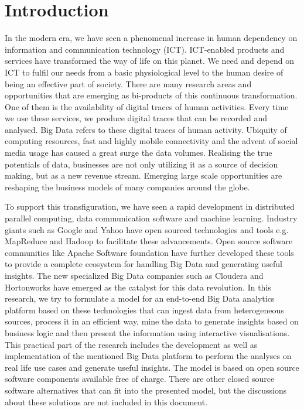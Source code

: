 \setcounter{page}{1}
\chapter{Introduction}
\label{chapter:intro}

 In the modern era, we have seen a phenomenal increase in human dependency on information and communication technology (ICT). ICT-enabled products and services have transformed the way of life on this planet. We need and depend on ICT to fulfil our needs from a basic physiological level to the human desire of being an effective part of society. There are many research areas and opportunities that are emerging as bi-products of this continuous transformation. One of them is the availability of digital traces of human activities. Every time we use these services, we produce digital traces that can be recorded and analysed. Big Data refers to these digital traces of human activity. Ubiquity of computing resources, fast and highly mobile connectivity and the advent of social media usage has caused a great surge the data volumes. Realising the true potentials of data, businesses are not only utilizing it as a source of decision making, but as a new revenue stream. Emerging large scale opportunities are reshaping the business models of many companies around the globe.
 
To support this transfiguration, we have seen a rapid development in distributed parallel computing, data communication software and machine learning. Industry giants such as Google and Yahoo have open sourced technologies and tools e.g. MapReduce and Hadoop to facilitate these advancements. Open source software communities like Apache Software foundation have further developed these tools to provide a complete ecosystem for handling Big Data and generating useful insights. The new specialized Big Data companies such as Cloudera and Hortonworks have emerged as the catalyst for this data revolution. In this research, we try to formulate a model for an end-to-end Big Data analytics platform based on these technologies that can ingest data from heterogeneous sources, process it in an efficient way, mine the data to generate insights based on business logic and then present the information using interactive visualisations. This practical part of the research includes the development as well as implementation of the mentioned Big Data platform to perform the analyses on real life use cases and generate useful insights. The model is based on open source software components available free of charge. There are other closed source software alternatives that can fit into the presented model, but the discussions about these solutions are not included in this document.

